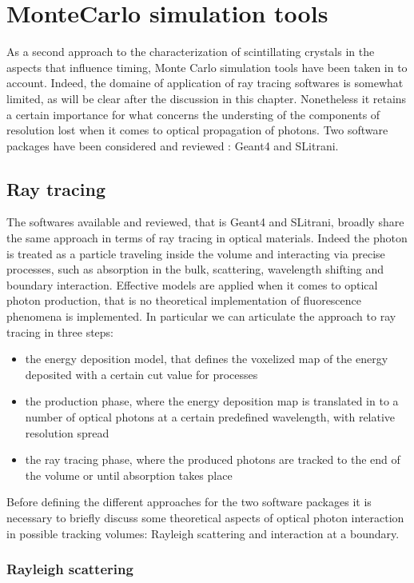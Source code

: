 
\chapter{MonteCarlo simulation tools}

As a second approach to the characterization of scintillating crystals in the aspects that influence timing, Monte Carlo simulation tools have been taken in to account. Indeed, the domaine of application of ray tracing softwares is somewhat limited, as will be clear after the discussion in this chapter. Nonetheless it retains a certain importance for what concerns the understing of the components of resolution lost when it comes to optical propagation of photons. Two software packages have been considered and reviewed \cite{Pizzi2012}: Geant4 and SLitrani.

\section{Ray tracing}

The softwares available and reviewed, that is Geant4 and SLitrani, broadly share the same approach in terms of ray tracing in optical materials. 
Indeed the photon is treated as a particle traveling inside the volume and interacting via precise processes, such as absorption in the bulk, scattering, wavelength shifting and boundary interaction. 
Effective models are applied when it comes to optical photon production, that is no theoretical implementation of fluorescence phenomena is implemented. In particular we can articulate the approach to ray tracing in three steps:
\begin{itemize}
\item the energy deposition model, that defines the voxelized map of the energy deposited with a certain cut value for processes
\item the production phase, where the energy deposition map is translated in to a number of optical photons at a certain predefined wavelength, with relative resolution spread
\item the ray tracing phase, where the produced photons are tracked to the end of the volume or until absorption takes place
\end{itemize}
Before defining the different approaches for the two software packages it is necessary to briefly discuss some theoretical aspects of optical photon interaction in possible tracking volumes: Rayleigh scattering and interaction at a boundary.

\subsection{Rayleigh scattering}

